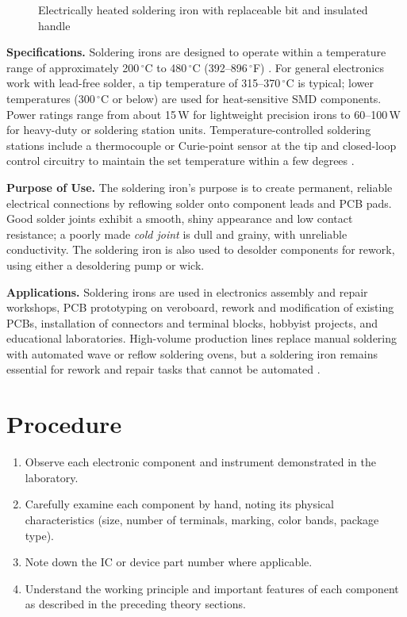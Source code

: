 \documentclass[12pt, a4paper, twoside]{report}
\newcommand{\imgplaceholder}[2]{%
  \begin{figure}[H]
    \centering
    \fcolorbox{gray!60}{gray!12}{%
      \parbox[c][5cm][c]{0.65\textwidth}{%
        \centering
        \textcolor{gray!80}{\Large [Image Placeholder]}\\[6pt]
        \textcolor{gray}{\small Insert figure here}
      }%
    }
    \caption{#1}
    \label{fig:#2}
  \end{figure}
}
\begin{document}
\imgplaceholder{Electrically heated soldering iron with replaceable bit and insulated handle}{solderiron}

\textbf{Specifications.}\quad
Soldering irons are designed to operate within a temperature range of approximately
200\,$^\circ$C to 480\,$^\circ$C (392--896\,$^\circ$F) \cite{wiki:solderiron}. For
general electronics work with lead-free solder, a tip temperature of 315--370\,$^\circ$C
is typical; lower temperatures (300\,$^\circ$C or below) are used for heat-sensitive
SMD components. Power ratings range from about 15\,W for lightweight precision irons to
60--100\,W for heavy-duty or soldering station units. Temperature-controlled soldering
stations include a thermocouple or Curie-point sensor at the tip and closed-loop control
circuitry to maintain the set temperature within a few degrees \cite{wiki:solderiron}.

\textbf{Purpose of Use.}\quad
The soldering iron's purpose is to create permanent, reliable electrical connections by
reflowing solder onto component leads and PCB pads. Good solder joints exhibit a smooth,
shiny appearance and low contact resistance; a poorly made \textit{cold joint} is dull
and grainy, with unreliable conductivity. The soldering iron is also used to desolder
components for rework, using either a desoldering pump or wick.

\textbf{Applications.}\quad
Soldering irons are used in electronics assembly and repair workshops, PCB prototyping
on veroboard, rework and modification of existing PCBs, installation of connectors and
terminal blocks, hobbyist projects, and educational laboratories. High-volume production
lines replace manual soldering with automated wave or reflow soldering ovens, but a
soldering iron remains essential for rework and repair tasks that cannot be automated
\cite{wiki:solderiron}.

\section{Procedure}

\begin{enumerate}
  \item Observe each electronic component and instrument demonstrated in the laboratory.
  \item Carefully examine each component by hand, noting its physical characteristics
        (size, number of terminals, marking, color bands, package type).
  \item Note down the IC or device part number where applicable.
  \item Understand the working principle and important features of each component as
        described in the preceding theory sections.
\end{enumerate}
\end{document}
